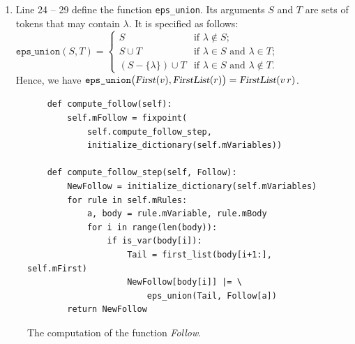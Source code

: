 \begin{enumerate}
\begin{enumerate}[(a)]
      \item If $\alpha$ starts with a variable $v$, line 17 splits $\alpha$ into $v$ and the list $r$ of the
            remaining symbols.  Line 18 -- 19 convert $r$ into a tuple and combine $\textsl{First}(v)$ with
            $\textsl{FirstList}(r)$ using the function \texttt{eps\_union}.
      \item Otherwise, $\alpha$ starts with a token $t$ and line 22 returns the set $\{t\}$.
      \end{enumerate}
\item Line 24 -- 29 define the function \texttt{eps\_union}.  Its arguments $S$ and $T$ are sets of tokens that
      may contain $\lambda$.  It is specified as follows:
      \\[0.2cm]
      \hspace*{1.3cm}
      $\texttt{eps\_union}(S, T) = \left\{
       \begin{array}{ll}
         S                         & \mbox{if $\lambda \not\in S$;} \\
         S \cup T                  & \mbox{if $\lambda \in S$ and $\lambda \in T$;} \\
         (S - \{\lambda\}) \cup T  & \mbox{if $\lambda \in S$ and $\lambda \not\in T$.}
       \end{array}
       \right.$
      \\[0.2cm]
      Hence, we have $\texttt{eps\_union}\bigl(\textsl{First}(v), \textsl{FirstList}(r)\bigr) =
      \textsl{FirstList}(v\, r)$.
\end{enumerate}

\begin{figure}[!ht]
\centering
\begin{verbatim}
    def compute_follow(self):
        self.mFollow = fixpoint(
            self.compute_follow_step,
            initialize_dictionary(self.mVariables))

    def compute_follow_step(self, Follow):
        NewFollow = initialize_dictionary(self.mVariables)
        for rule in self.mRules:
            a, body = rule.mVariable, rule.mBody
            for i in range(len(body)):
                if is_var(body[i]):
                    Tail = first_list(body[i+1:], self.mFirst)
                    NewFollow[body[i]] |= \
                        eps_union(Tail, Follow[a])
        return NewFollow
\end{verbatim}
\vspace*{-0.3cm}
\caption{The computation of the function \textsl{Follow}.}
\label{fig:04-SLR-Table-Generator.ipynb:compute_follow}
\end{figure}

